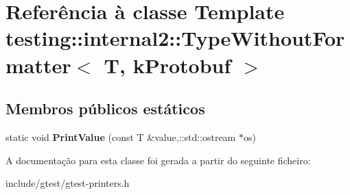 \hypertarget{classtesting_1_1internal2_1_1TypeWithoutFormatter_3_01T_00_01kProtobuf_01_4}{\section{Referência à classe Template testing\-:\-:internal2\-:\-:Type\-Without\-Formatter$<$ T, k\-Protobuf $>$}
\label{classtesting_1_1internal2_1_1TypeWithoutFormatter_3_01T_00_01kProtobuf_01_4}
}
\subsection*{Membros públicos estáticos}
\begin{DoxyCompactItemize}
\item 
\hypertarget{classtesting_1_1internal2_1_1TypeWithoutFormatter_3_01T_00_01kProtobuf_01_4_a714da93952c590db954228bd9cc60abf}{static void {\bfseries Print\-Value} (const T \&value,\-::std\-::ostream $\ast$os)}\label{classtesting_1_1internal2_1_1TypeWithoutFormatter_3_01T_00_01kProtobuf_01_4_a714da93952c590db954228bd9cc60abf}

\end{DoxyCompactItemize}


A documentação para esta classe foi gerada a partir do seguinte ficheiro\-:\begin{DoxyCompactItemize}
\item 
include/gtest/gtest-\/printers.\-h\end{DoxyCompactItemize}
